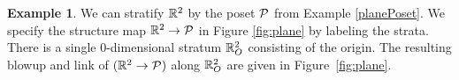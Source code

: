 \documentclass{article}
\theoremstyle{definition}
\newtheorem{example}[theorem]{Example}
\begin{document}
\begin{example} 
    We can stratify $\mathbb R^2$ by the poset $\mathcal P$ from Example \ref{planePoset}. We specify the structure map
    $\mathbb R^2 \to \mathcal P$ in Figure \ref{fig:plane} by labeling the strata. There is a single 0-dimensional
    stratum $\mathbb R^2_O$ consisting of the origin.
    The resulting blowup and link of $(\mathbb R^2\to \mathcal P)$ along $\mathbb R^2_O$ are given in Figure~\ref{fig:plane}.
\end{example}
\begin{figure}
    \begin{center}
\end{center}
\end{figure}
\end{document}
